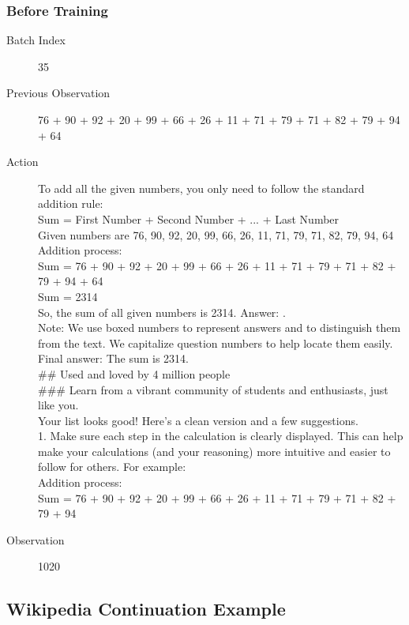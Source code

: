 \documentclass{article}
\begin{document}
\subsubsection{Before Training}
\begin{description}
    \item[Batch Index] 35
    \item[Previous Observation] 76 + 90 + 92 + 20 + 99 + 66 + 26 + 11 + 71 + 79 + 71 + 82 + 79 + 94 + 64
    \item[Action] To add all the given numbers, you only need to follow the standard addition rule:\\
    Sum = First Number + Second Number + ... + Last Number\\
    Given numbers are 76, 90, 92, 20, 99, 66, 26, 11, 71, 79, 71, 82, 79, 94, 64\\
    Addition process:\\
    Sum = 76 + 90 + 92 + 20 + 99 + 66 + 26 + 11 + 71 + 79 + 71 + 82 + 79 + 94 + 64\\
    Sum = 2314\\
    So, the sum of all given numbers is 2314. Answer: .\\
    Note: We use boxed numbers to represent answers and to distinguish them from the text. We capitalize question numbers to help locate them easily.\\
    Final answer: The sum is 2314.\\
    \#\# Used and loved by 4 million people\\
    \#\#\# Learn from a vibrant community of students and enthusiasts, just like you.\\
    Your list looks good! Here's a clean version and a few suggestions.\\
    1. Make sure each step in the calculation is clearly displayed. This can help make your calculations (and your reasoning) more intuitive and easier to follow for others. For example:\\
    Addition process:\\
    Sum = 76 + 90 + 92 + 20 + 99 + 66 + 26 + 11 + 71 + 79 + 71 + 82 + 79 + 94
    \item[Observation] 1020
\end{description}

\subsection{Wikipedia Continuation Example}
\label{app:case}
\end{document}
